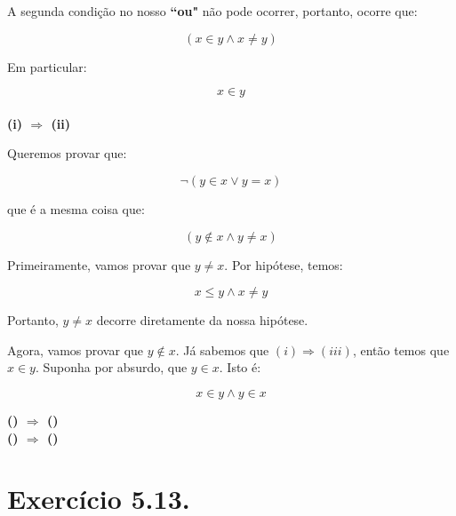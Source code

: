 \documentclass[12pt]{extarticle}
\newcommand{\asp}[1]{``#1"}
\begin{document}
A segunda condição no nosso \textbf{\asp{ou}} não pode ocorrer, portanto, ocorre que:

$$
(x \in y \land x \neq y)
$$
 
 Em particular:
 
$$
x \in y
$$
\\
\textbf{(i) $\Rightarrow$ (ii)}

Queremos provar que:

$$
\neg (y \in x \lor y = x)
$$

que é a mesma coisa que:

$$
(y \notin x \land y \neq x)
$$

Primeiramente, vamos provar que $y \neq x$. Por hipótese, temos: 

$$
x \leq y \land x \neq y
$$

Portanto, $y \neq x$ decorre diretamente da nossa hipótese.

Agora, vamos provar que $y \notin x$. Já sabemos que $(i) \Rightarrow (iii)$, então temos que $x \in y$. Suponha por absurdo, que $y \in x$. Isto é:

$$
x \in y \land y \in x
$$



\textbf{() $\Rightarrow$ ()}
\\
\textbf{() $\Rightarrow$ ()}
\\
\section{Exercício 5.13.}
\end{document}
